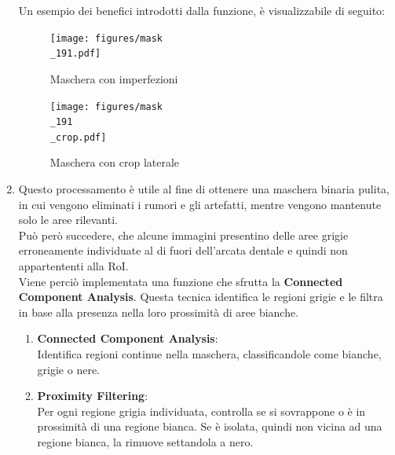 \documentclass[12pt,a4paper,openright,twoside]{book}
\begin{document}
\begin{enumerate}
Un esempio dei benefici introdotti dalla funzione, è visualizzabile di seguito: 
\begin{figure}[H]
    \centering
    \begin{minipage}{0.45\textwidth}
	\centering
    	\texttt{[image: figures/mask\\\_191.pdf]}
    	\caption{Maschera con imperfezioni}
    	\label{lab:Maschera imperfetta}
    \end{minipage}\hfill
    \begin{minipage}{0.45\textwidth}
    	\centering
    	\texttt{[image: figures/mask\\\_191\\\_crop.pdf]}
    	\caption{Maschera con crop laterale}
    	\label{lab:Maschera dilatata}
    \end{minipage}\hfill
\end{figure}

\item Questo processamento è utile al fine di ottenere una maschera binaria pulita, in cui vengono eliminati i rumori e gli artefatti, mentre vengono mantenute solo le aree rilevanti. \\
Può però succedere, che alcune immagini presentino delle aree grigie erroneamente individuate al di fuori dell'arcata dentale e quindi non appartententi alla RoI. \\
Viene perciò implementata una funzione che sfrutta la \textbf{Connected Component Analysis}. Questa tecnica identifica le regioni grigie e le filtra in base alla presenza nella loro prossimità di aree bianche. 
\begin{enumerate}
\item \textbf{Connected Component Analysis}:\\
Identifica regioni continue nella maschera, classificandole come bianche, grigie o nere.
\item \textbf{Proximity Filtering}: \\
Per ogni regione grigia individuata, controlla se si sovrappone o è in prossimità di una regione bianca. Se è isolata, quindi non vicina ad una regione bianca, la rimuove settandola a nero.
\end{enumerate}
\begin{figure}[H]
    \centering
    
\end{figure}

\end{enumerate}
\end{document}

